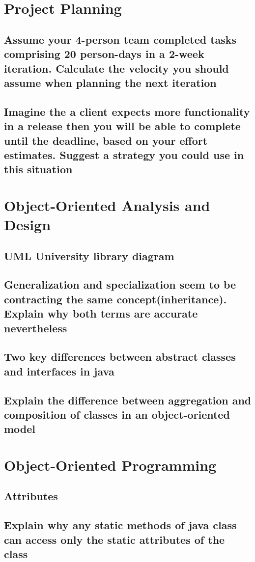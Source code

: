 \documentclass[]{article}
\begin{document}
\section{Project Planning}
\subsection{Assume your 4-person team completed tasks comprising 20 person-days in a 2-week iteration. Calculate the velocity you should assume when planning the next iteration}
\subsection{Imagine the a client expects more functionality in a release then you will be able to complete until the deadline, based on your effort estimates. Suggest a strategy you could use in this situation}

\section{Object-Oriented Analysis and Design}
\subsection{UML University library diagram}
\subsection{Generalization and specialization seem to be contracting the same concept(inheritance). Explain why both terms are accurate nevertheless}
\subsection{Two key differences between abstract classes and interfaces in java}
\subsection{Explain the difference between aggregation and composition of classes in an object-oriented model}

\section{Object-Oriented Programming}
\subsection{Attributes}
\subsection{Explain why any static methods of java class can access only the static attributes of the class}
\end{document}
